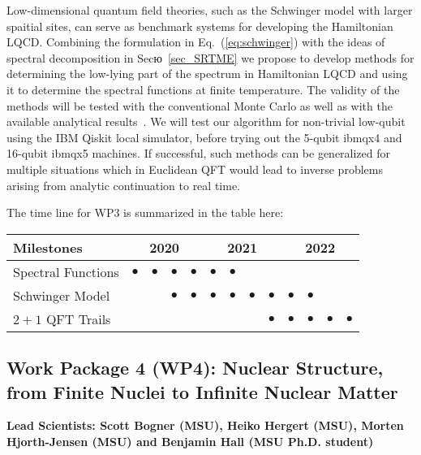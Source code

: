 \documentclass[11pt]{article}
\begin{document}
Low-dimensional quantum field theories, such as the Schwinger model with larger spaitial sites,
can serve as benchmark systems for developing the Hamiltonian LQCD.
Combining the formulation in Eq.~(\ref{eq:schwinger}) with the ideas
of spectral decomposition 
in Secю~\ref{sec_SRTME}
we propose
to develop methods for determining the low-lying part of the spectrum
in Hamiltonian LQCD and using it to determine the spectral functions
at finite temperature. The validity of the methods will be tested with the
conventional Monte Carlo as well as with the available analytical
results~\cite{Fayyazuddin:1993ua}. 
We will test our algorithm for non-trivial low-qubit using the IBM Qiskit local simulator, before trying out the 5-qubit ibmqx4 and 16-qubit ibmqx5 machines. 
If successful, such methods can be generalized for
multiple situations which in Euclidean QFT would lead to inverse problems arising
from analytic continuation to real time.



The time line for WP3 is summarized in the table here:
\begin{footnotesize}
\begin{center}
\begin{tabular}{|l|c|c|c|c|c|c|c|c|c|c|c|c|}
\hline
\multicolumn{1}{|l}{Milestones } & \multicolumn{4}{|c|}{ 2020 } & \multicolumn{4}{c|}{ 2021 } & \multicolumn{4}{c|}{ 2022 } \\
\hline
Spectral  Functions   & $\bullet$&$\bullet$ & $\bullet$&$\bullet$ &$\bullet$ &$\bullet$ & & & & &  &  \\
\hline
Schwinger  Model & & &$\bullet$ &$\bullet$ & $\bullet$ &$\bullet$ & $\bullet$ & $\bullet$ &$\bullet$ & $\bullet$ &  &  \\
\hline
$2+1$ QFT Trails & && & & & & & $\bullet$ & $\bullet$ &$\bullet$ & $\bullet$& $\bullet$ \\
\hline

\end{tabular}
\end{center}
\end{footnotesize}





\subsection{Work Package 4 (WP4): Nuclear Structure, from Finite Nuclei to Infinite Nuclear Matter}
{\bf Lead Scientists: Scott Bogner (MSU), Heiko Hergert (MSU), Morten Hjorth-Jensen (MSU) and Benjamin Hall (MSU Ph.D. student)}
\end{document}

